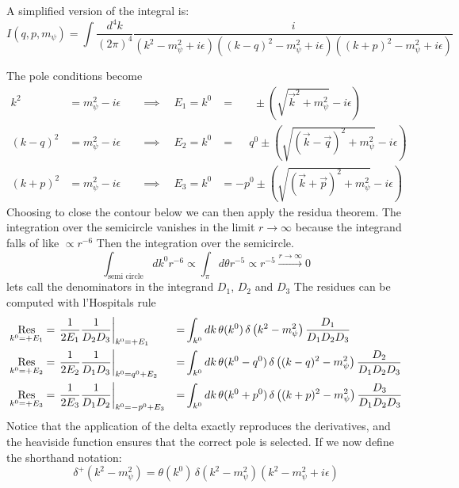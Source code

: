 A simplified version of the integral is:
\begin{equation}
I(q,p,m_\psi)=\int\frac{d^4k}{(2\pi)^4}
\frac{i}{\left(k^2-m_\psi^2+i\epsilon\right)\left((k-q)^2-m_\psi^2+i\epsilon\right)\left((k+p)^2-m_\psi^2+i\epsilon\right)}
\end{equation}

The pole conditions become
\begin{align}
    k^2 &= m_\psi^2-i\epsilon \quad &\implies\quad E_1=k^0 &= \phantom{-q^0} \pm\left(\sqrt{\vec{k}^2+m_\psi^2}-i\epsilon\right)          \\
(k-q)^2 &= m_\psi^2-i\epsilon \quad &\implies\quad E_2=k^0 &= \phantom{-}q^0 \pm\left(\sqrt{(\vec{k}-\vec{q})^2+m_\psi^2}-i\epsilon\right)\\
(k+p)^2 &= m_\psi^2-i\epsilon \quad &\implies\quad E_3=k^0 &=           -p^0 \pm\left(\sqrt{(\vec{k}+\vec{p})^2+m_\psi^2}-i\epsilon\right)
\end{align}
Choosing to close the contour below we can then apply the residua theorem.
The integration over the semicircle vanishes in the limit $r\to\infty$ because the integrand falls of like $\propto r^{-6}$
Then the integration over the semicircle.
\begin{equation}
    \int_{\text{semi circle}} dk^0 r^{-6} \propto \int_{\pi} d\theta r^{-5} \propto r^{-5} \overset{r\to\infty}{\longrightarrow} 0
\end{equation}
lets call the denominators in the integrand $D_1$, $D_2$ and $D_3$
The residues can be computed with l'Hospitals rule
\begin{align*}
\Op{Res}_{k^0 = +E_1} &= \left. \frac{1}{2 E_1} \frac{1}{D_2 D_3} \right|_{k^0 = +E_1}
    &=& \int_{k^0} d k \, \theta(k^0) \, \delta\left(k^2 - m_\psi^2\right) \frac{D_1}{D_1D_2D_3} \\
\Op{Res}_{k^0 = +E_2} &= \left. \frac{1}{2 E_2} \frac{1}{D_1D_3} \right|_{k^0 = q^0 + E_2}
    &=& \int_{k^0} d k \, \theta(k^0 - q^0) \, \delta\left((k-q)^2 - m_\psi^2\right) \frac{D_2}{D_1D_2D_3} \\
\Op{Res}_{k^0 = +E_3} &= \left. \frac{1}{2 E_3} \frac{1}{D_1D_2} \right|_{k^0 = -p^0 + E_3}
    &=& \int_{k^0} d k \, \theta(k^0 + p^0) \, \delta\left((k+p)^2 - m_\psi^2\right) \frac{D_3}{D_1D_2D_3}
\end{align*}
Notice that the application of the delta exactly reproduces the derivatives, and the heaviside function ensures that the correct pole is selected.
If we now define the shorthand notation:
\begin{equation}
    \delta^{+}\left( k^2 - m_\psi^2 \right) = \theta(k^0) \, \delta\left(k^2 - m_\psi^2\right) \left(k^2 - m_\psi^2 + i\epsilon\right)
\end{equation}
